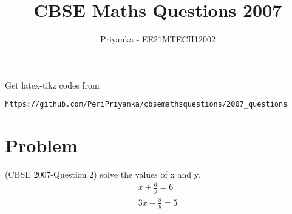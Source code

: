 \documentclass[journal,12pt,twocolumn]{IEEEtran}
\begin{document}
     \def\rightbox#1{\makebox[0in][r]{#1}}
     \def\centbox#1{\makebox[0in]{#1}}
     \def\topbox#1{\raisebox{-\baselineskip}[0in][0in]{#1}}
     \def\midbox#1{\raisebox{-0.5\baselineskip}[0in][0in]{#1}}
\vspace{3cm}
\title{CBSE Maths Questions 2007}
\author{Priyanka - EE21MTECH12002}
\maketitle
\newpage
\bigskip
\renewcommand{\thefigure}{\theenumi}
\renewcommand{\thetable}{\theenumi}
%
Get latex-tikz codes from 
%
\begin{lstlisting}
https://github.com/PeriPriyanka/cbsemathsquestions/2007_questions
\end{lstlisting}
\section{Problem}

(CBSE 2007-Question 2)
solve the values of x and y.
\begin{align}
x+\displaystyle\frac{6}{y}=6\\
3x-\displaystyle\frac{8}{y}=5
\end{align}
\end{document}
